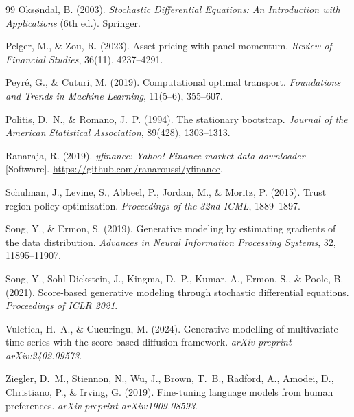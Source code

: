 \documentclass{article}
\begin{document}
\begin{thebibliography}{99}
Oks{\o}ndal, B. (2003).
\newblock \emph{Stochastic Differential Equations: An Introduction with
  Applications} (6th ed.).
\newblock Springer.

Pelger, M., \& Zou, R. (2023).
\newblock Asset pricing with panel momentum.
\newblock \emph{Review of Financial Studies}, 36(11), 4237--4291.

Peyr\'{e}, G., \& Cuturi, M. (2019).
\newblock Computational optimal transport.
\newblock \emph{Foundations and Trends in Machine Learning}, 11(5--6),
  355--607.

Politis, D.~N., \& Romano, J.~P. (1994).
\newblock The stationary bootstrap.
\newblock \emph{Journal of the American Statistical Association}, 89(428),
  1303--1313.

Ranaraja, R. (2019).
\newblock \emph{yfinance: Yahoo! Finance market data downloader} [Software].
\newblock \url{https://github.com/ranaroussi/yfinance}.

Schulman, J., Levine, S., Abbeel, P., Jordan, M., \& Moritz, P. (2015).
\newblock Trust region policy optimization.
\newblock \emph{Proceedings of the 32nd ICML}, 1889--1897.

Song, Y., \& Ermon, S. (2019).
\newblock Generative modeling by estimating gradients of the data distribution.
\newblock \emph{Advances in Neural Information Processing Systems}, 32,
  11895--11907.

Song, Y., Sohl-Dickstein, J., Kingma, D.~P., Kumar, A., Ermon, S., \& Poole,
  B. (2021).
\newblock Score-based generative modeling through stochastic differential
  equations.
\newblock \emph{Proceedings of ICLR 2021}.

Vuletich, H.~A., \& Cucuringu, M. (2024).
\newblock Generative modelling of multivariate time-series with the score-based
  diffusion framework.
\newblock \emph{arXiv preprint arXiv:2402.09573}.

Ziegler, D.~M., Stiennon, N., Wu, J., Brown, T.~B., Radford, A., Amodei, D.,
  Christiano, P., \& Irving, G. (2019).
\newblock Fine-tuning language models from human preferences.
\newblock \emph{arXiv preprint arXiv:1909.08593}.

\end{thebibliography}
\end{document}
